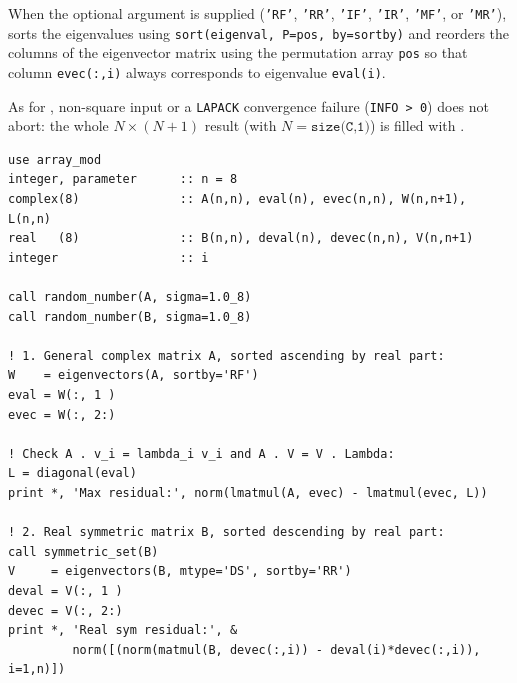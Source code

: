 When the optional argument  is supplied (\texttt{'RF'}, \texttt{'RR'}, \texttt{'IF'}, \texttt{'IR'}, \texttt{'MF'}, or \texttt{'MR'}),  sorts the eigenvalues using \texttt{sort(eigenval, P=pos, by=sortby)} and reorders the columns of the eigenvector matrix using the permutation array \texttt{pos} so that column \texttt{evec(:,i)} always corresponds to eigenvalue \texttt{eval(i)}.

As for , non-square input or a \texttt{LAPACK} convergence failure (\texttt{INFO > 0}) does not abort: the whole $N\times(N+1)$ result (with $N = \texttt{size(C,1)}$) is filled with .

\begin{description}[leftmargin=2.2cm, style=nextline]
\end{description}

\lstset{language=[95]Fortran}
\begin{lstlisting}
use array_mod
integer, parameter      :: n = 8
complex(8)              :: A(n,n), eval(n), evec(n,n), W(n,n+1), L(n,n)
real   (8)              :: B(n,n), deval(n), devec(n,n), V(n,n+1)
integer                 :: i

call random_number(A, sigma=1.0_8)
call random_number(B, sigma=1.0_8)

! 1. General complex matrix A, sorted ascending by real part:
W    = eigenvectors(A, sortby='RF')
eval = W(:, 1 )
evec = W(:, 2:)

! Check A . v_i = lambda_i v_i and A . V = V . Lambda:
L = diagonal(eval)
print *, 'Max residual:', norm(lmatmul(A, evec) - lmatmul(evec, L))

! 2. Real symmetric matrix B, sorted descending by real part:
call symmetric_set(B)
V     = eigenvectors(B, mtype='DS', sortby='RR')
deval = V(:, 1 )
devec = V(:, 2:)
print *, 'Real sym residual:', &
         norm([(norm(matmul(B, devec(:,i)) - deval(i)*devec(:,i)), i=1,n)])
\end{lstlisting}
